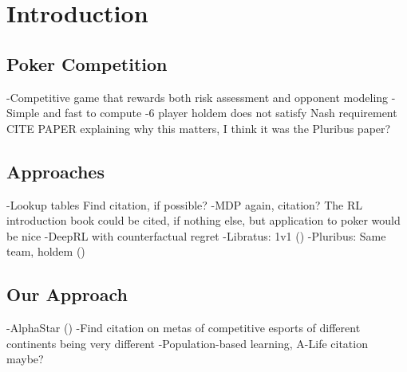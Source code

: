 \chapter{Introduction}

\section{Poker Competition}
-Competitive game that rewards both risk assessment and opponent modeling
-Simple and fast to compute
-6 player holdem does not satisfy Nash requirement {CITE PAPER explaining why this matters, I think it was the Pluribus paper?}

\section{Approaches}
-Lookup tables {Find citation, if possible?}
-MDP {again, citation? The RL introduction book could be cited, if nothing else, but application to poker would be nice}
-DeepRL with counterfactual regret
    -Libratus: 1v1 (\cite{Libratus})
    -Pluribus: Same team, holdem (\cite{Pluribus})

\section{Our Approach}
-AlphaStar (\cite{AlphaStar})
-{Find citation on metas of competitive esports of different continents being very different}
-Population-based learning, A-Life citation maybe?
